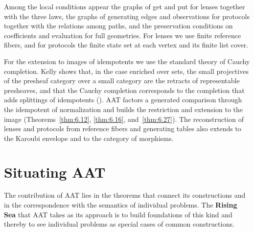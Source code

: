 Among the local conditions appear the graphs of get and put for lenses together with the
three laws, the graphs of generating edges and observations for protocols together with the
relations among paths, and the preservation conditions on coefficients and evaluation for
full geometries. For lenses we use finite reference fibers, and for protocols the finite
state set at each vertex and its finite list cover.

For the extension to images of idempotents we use the standard theory of Cauchy completion.
Kelly shows that, in the case enriched over sets, the small projectives of the presheaf
category over a small category are the retracts of representable presheaves, and that the
Cauchy completion corresponds to the completion that adds splittings of idempotents
(\cite[\href{https://www.sas.rochester.edu/mth/sites/doug-ravenel/otherpapers/kelly-book.pdf}{\S5.8, Theorem 5.36}]{Kelly82}).
AAT factors a generated comparison through the idempotent of normalization and builds the
restriction and extension to the image
(Theorems~\ref{thm:6.12}, \ref{thm:6.16}, and~\ref{thm:6.27}). The reconstruction of lenses
and protocols from reference fibers and generating tables also extends to the Karoubi
envelope and to the category of morphisms.

\section{Situating AAT}\label{sec:R.7}

The contribution of AAT lies in the theorems that connect its constructions and in the
correspondence with the semantics of individual problems.
The \textbf{Rising Sea} that AAT takes as its approach is to build foundations of this
kind and thereby to see individual problems as special cases of common constructions.
